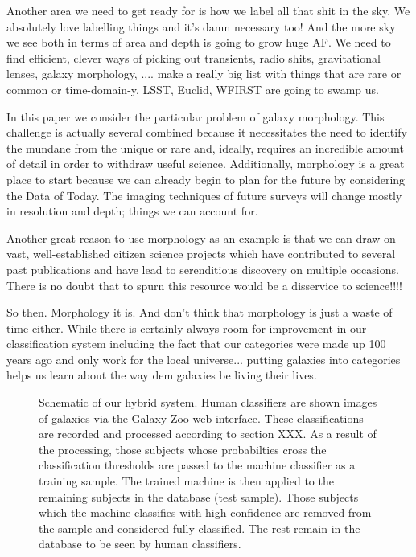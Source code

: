 \documentclass[twocolumn]{aastex6}
\begin{document}
Another area we need to get ready for is how we label all that shit in the sky. 
We absolutely love labelling things and it's damn necessary too! And the more sky
we see both in terms of area and depth is going to grow huge AF. We need to find 
efficient, clever ways of picking out transients, radio shits, gravitational lenses, 
galaxy morphology, .... make a really big list with things that are rare or common
or time-domain-y. LSST, Euclid, WFIRST are going to swamp us. 

In this paper we consider the particular problem of galaxy morphology. This 
challenge is actually several combined because it necessitates the need to 
identify the mundane from the unique or rare and, ideally, requires an incredible
amount of detail in order to withdraw useful science. Additionally, morphology is
a great place to start because we can already begin to plan for the future by 
considering the Data of Today. The imaging techniques of future surveys will 
change mostly in resolution and depth; things we can account for. 

Another great reason to use morphology as an example is that we can draw on 
vast, well-established citizen science projects which have contributed to several 
past publications and have lead to serenditious discovery on multiple occasions. 
There is no doubt that to spurn this resource would be a disservice to science!!!!

So then. Morphology it is. And don't think that morphology is just a waste of time
either. While there is certainly always room for improvement in our classification 
system including the fact that our categories were made up 100 years ago and only 
work for the local universe... putting galaxies into categories helps us learn 
about the way dem galaxies be living their lives. 

\begin{figure}[ht!]
\caption{Schematic of our hybrid system. Human classifiers are shown images of galaxies via the Galaxy Zoo web interface. These  classifications are recorded and processed according to section XXX. As a result of the processing, those subjects whose probabilties cross the classification thresholds are passed to the machine classifier as a training sample. The trained machine is then applied to the remaining subjects in the database (test sample). Those subjects which the machine classifies with high confidence are removed from the sample and considered fully classified. The rest remain in the database to be seen by human classifiers. \label{fig:schematic}}
\end{figure}
\end{document}
